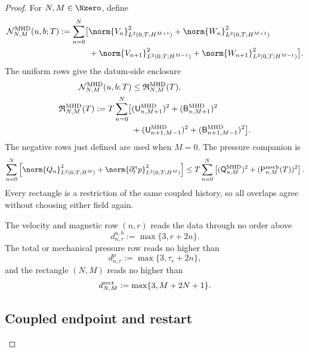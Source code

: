 \begin{proof}
For \(N,M\in\Nzero\), define
\begin{align}
 \mathcal N_{N,M}^{\rm MHD}(u,b;T)
 :=\sum_{n=0}^N\bigl[
 &\norm{V_n}_{L^2(0,T;H^{M+1})}^2
 +\norm{W_n}_{L^2(0,T;H^{M+1})}^2
 \notag\\
 &+\norm{V_{n+1}}_{L^2(0,T;H^{M-1})}^2
 +\norm{W_{n+1}}_{L^2(0,T;H^{M-1})}^2
 \bigr].
 \label{eq:mhd-rectangle-norm}
\end{align}
The uniform rows give the datum-side enclosure
\begin{align}
 \mathcal N_{N,M}^{\rm MHD}(u,b;T)
 &\le\mathfrak R_{N,M}^{\rm MHD}(T),
 \label{eq:mhd-rectangle-bound}\\
 \mathfrak R_{N,M}^{\rm MHD}(T)
 :=T\sum_{n=0}^N\bigl[
 &(\mathsf U_{n,M+1}^{\rm MHD})^2
 +(\mathsf B_{n,M+1}^{\rm MHD})^2
 \notag\\
 &+(\mathsf U_{n+1,M-1}^{\rm MHD})^2
 +(\mathsf B_{n+1,M-1}^{\rm MHD})^2
 \bigr].
 \label{eq:mhd-rectangle-envelope}
\end{align}
The negative rows just defined are used when \(M=0\).  The pressure companion
is
\begin{equation}
 \sum_{n=0}^N\left[
  \norm{Q_n}_{L^2(0,T;H^M)}^2
  +\norm{\partial_t^np}_{L^2(0,T;H^M)}^2
 \right]
 \le T\sum_{n=0}^N\left[
  (\mathsf Q_{n,M}^{\rm MHD})^2
  +(\mathsf P_{n,M}^{\rm mech}(T))^2
 \right].
 \label{eq:mhd-pressure-rectangle}
\end{equation}
Every rectangle is a restriction of the same coupled history, so all
overlaps agree without choosing either field again.

The velocity and magnetic row \((n,r)\) reads the data through no order above
\begin{equation}
 d_{n,r}^{u,b}:=\max\{3,r+2n\}.
 \label{eq:mhd-field-ledger}
\end{equation}
The total or mechanical pressure row reads no higher than
\begin{equation}
 d_{n,r}^{p}:=\max\{3,\tau_r+2n\},
 \label{eq:mhd-pressure-ledger}
\end{equation}
and the rectangle \((N,M)\) reads no higher than
\begin{equation}
 d_{N,M}^{\rm rect}:=\max\{3,M+2N+1\}.
 \label{eq:mhd-rectangle-ledger}
\end{equation}

\subsection{Coupled endpoint and restart}


\end{proof}
